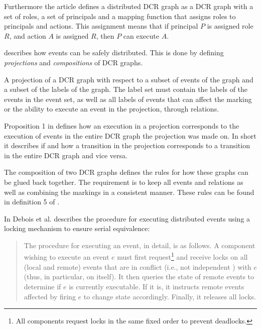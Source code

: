 	Furthermore the article defines a distributed DCR graph as a DCR graph with a set of roles, a set of principals and a mapping function that assigns roles to principals and actions. This assignment means that if principal $P$ is assigned role $R$, and action $A$ is assigned $R$, then $P$ can execute $A$.
		
	\newpar
	\cite{hildebrandt2011safe} describes how events can be safely distributed. This is done by defining \textit{projections} and \textit{compositions} of DCR graphs.
	
	\newpar
	A projection of a DCR graph with respect to a subset of events of the graph and a subset of the labels of the graph. The label set must contain the labels of the events in the event set, as well as all labels of events that can affect the marking or the ability to execute an event in the projection, through relations.
	
	\newpar
	Proposition 1 in \cite{hildebrandt2011safe} defines how an execution in a projection corresponds to the execution of events in the entire DCR graph the projection was made on. In short it describes if and how a transition in the projection corresponds to a transition in the entire DCR graph and vice versa.
	
	\newpar
	The composition of two DCR graphs defines the rules for how these graphs can be glued back together. The requirement is to keep all events and relations as well as combining the markings in a consistent manner. These rules can be found in definition 5 of \cite{hildebrandt2011safe}.
	
	\newpar 
	In \cite{debois2015concurrency} Debois et al. describes the procedure for executing distributed events using a locking mechanism to ensure serial equivalence:
	
	\begin{quotation}
		The procedure for executing an event, in detail, is as follows. A component
		wishing to execute an event $e$ must first request\footnote{All components request locks in the same fixed order to prevent deadlocks.} and receive locks on all (local
		and remote) events that are in conflict (i.e., not independent ) with $e$ (thus, in
		particular, on itself). It then queries the state of remote events to determine if
		$e$ is currently executable. If it is, it instructs remote events affected by firing $e$
		to change state accordingly. Finally, it releases all locks.
	\end{quotation}

	

